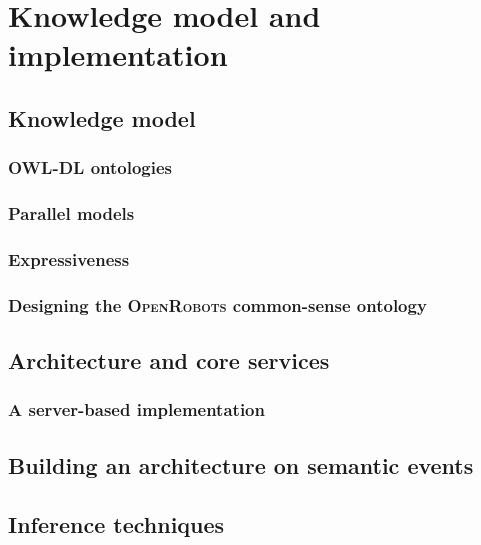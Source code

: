 \chapter{Knowledge model and implementation}
\label{chapter|implementation}

\section{Knowledge model}
\label{sect|knowledge-model}

\subsection{OWL-DL ontologies}
\label{sect|owldl-ontologies}

\subsection{Parallel models}
\label{sect|parallel-models}

\subsection{Expressiveness}
\label{sect|expressiveness}

\subsection{Designing the \textsc{OpenRobots} common-sense ontology}
\label{sect|commonsense-design}

\section{ Architecture and core services}
\label{sect|oro-core}

\subsection{A server-based implementation}
\label{sect|oro-serverbased}

\section{Building an architecture on semantic events}
\label{sect|events}

\section{Inference techniques}
\label{sect|inference-techniques}

